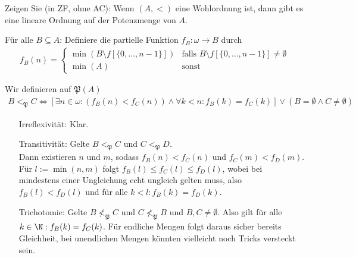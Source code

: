 
\begin{exercise}[287]

Zeigen Sie (in ZF, ohne AC): Wenn $(A,<)$ eine Wohlordnung ist, dann gibt es eine
lineare Ordnung auf der Potenzmenge von $A$.
\end{exercise}


\begin{solution}
Für alle $B \subseteq A$: Definiere die partielle Funktion $f_B: \omega \to B$ durch
\begin{align*}
  f_B(n) = \begin{cases}
    \min(B \setminus f[\{0,\dots,n-1\}]) & \text{falls }
    B \setminus f[\{0,\dots,n-1\}] \neq \emptyset \\
    \min(A) & \text{sonst}
  \end{cases}
\end{align*}

Wir definieren auf $\mathfrak{P}(A)$
\begin{align*}
  B <_\mathfrak{P} C \iff [\exists n \in \omega: (f_B(n) < f_C(n)) \land \forall k < n: f_B(k) = f_C(k)] \lor (B = \emptyset \land C \neq \emptyset)
\end{align*}

\begin{itemize}
  \item[Irreflexivität:] Klar.
  \item[Transitivität:] Gelte $B <_\mathfrak{P} C$ und $C <_\mathfrak{P} D$. \\
  Dann existieren $n$ und $m$, sodass
  $f_B(n) < f_C(n)$ und $f_C(m) < f_D(m)$. Für $l := \min(n,m)$
  folgt $f_B(l) \leq f_C(l) \leq f_D(l)$, wobei bei mindestens einer Ungleichung
  echt ungleich gelten muss, also $f_B(l) < f_D(l)$ und für alle $k < l: f_B(k) = f_D(k)$.

  \item[Trichotomie:] Gelte $B \nless_\mathfrak{P} C$ und $C \nless_\mathfrak{P} B$
  und $B, C \neq \emptyset$. Also gilt für alle $k \in \N: f_B(k) = f_C(k)$.
  Für endliche Mengen folgt daraus sicher bereits Gleichheit, bei
  unendlichen Mengen könnten vielleicht noch Tricks versteckt sein.
\end{itemize}

\end{solution}


